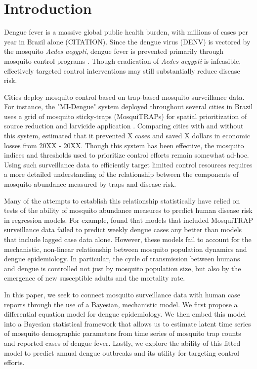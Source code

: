 \documentclass[10pt,letterpaper]{article}
\begin{document}
\linenumbers

\section*{Introduction}

Dengue fever is a massive global public health burden, with millions of cases per year in Brazil alone (CITATION).  
Since the dengue virus (DENV) is vectored by the mosquito \textit{Aedes aegypti}, dengue fever is prevented primarily through mosquito control programs \cite{Achee2015}.
Though eradication of \textit{Aedes aegypti} is infeasible, effectively targeted control interventions may still substantially reduce disease risk.

Cities deploy mosquito control based on trap-based mosquito surveillance data.
For instance, the "MI-Dengue" system deployed throughout several cities in Brazil uses a grid of mosquito sticky-traps (MosquiTRAPs) for spatial prioritization of source reduction and larvicide application \cite{Eiras2009}.
Comparing cities with and without this system, \cite{Pepin2013} estimated that it prevented X cases and saved X dollars in economic losses from 20XX - 20XX.
Though this system has been effective, the mosquito indices and thresholds used to prioritize control efforts remain somewhat ad-hoc.
Using such surveillance data to efficiently target limited control resources requires a more detailed understanding of the relationship between the components of mosquito abundance measured by traps and disease risk.

Many of the attempts to establish this relationship statistically have relied on tests of the ability of mosquito abundance measures to predict human disease risk in regression models.
For example, \cite{Pepin2015} found that models that included MosquiTRAP surveillance data failed to predict weekly dengue cases any better than models that include lagged case data alone.
However, these models fail to account for the mechanistic, non-linear relationship between mosquito population dynamics and dengue epidemiology.
In particular, the cycle of transmission between humans and dengue is controlled not just by mosquito population size, but also by the emergence of new susceptible adults and the mortality rate.

In this paper, we seek to connect mosquito surveillance data with human case reports through the use of a Bayesian, mechanistic model.
We first propose a differential equation model for dengue epidemiology.
We then embed this model into a Bayesian statistical framework that allows us to estimate latent time series of mosquito demographic parameters from time series of mosquito trap counts and reported cases of dengue fever.
Lastly, we explore the ability of this fitted model to predict annual dengue outbreaks and its utility for targeting control efforts.
\end{document}
